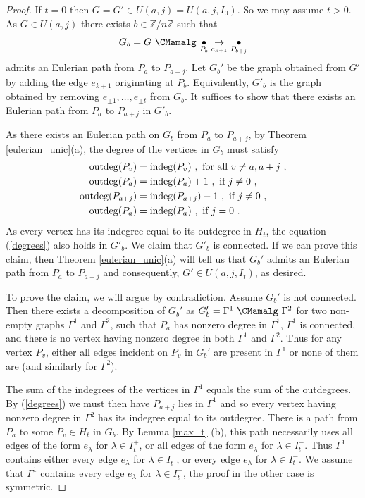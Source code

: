 \documentclass{amsproc}
\theoremstyle{definition}
\theoremstyle{remark}
\numberwithin{equation}{section}
\newcommand{\Z}{{\mathbb Z}}
\newcommand{\indeg}{{\rm indeg}}
\newcommand{\outdeg}{{\rm outdeg}}
\begin{document}
\begin{proof}
If $t=0$ then $G=G'\in U(a,j)=U(a,j,I_0)$. So we may assume $t>0$.
As $G\in U(a,j)$ there exists $b\in \Z/n\Z$ such that 
\[ G_b={G\ \CMamalg\ \underset{P_b}\bullet\underset{e_{k+1}}\rightarrow\underset {P_{b+j}}\bullet} \]
admits an Eulerian path from $P_a$ to $P_{a+j}$. Let $G_b'$ be the graph obtained from $G'$ by adding the edge $e_{k+1}$ originating at $P_b$.
Equivalently, $G'_b$ is the graph obtained by removing $e_{\pm 1}, \ldots, e_{\pm t}$ from $G_b$.
It suffices to show that there exists an Eulerian path from $P_a$ to $P_{a+j}$ in $G'_b$.

As there exists an Eulerian path on $G_b$ from $P_a$ to $P_{a+j}$, by Theorem \ref{eulerian_unic}(a), the degree of the vertices in $G_b$ must satisfy
\begin{equation}\label{degrees}
\begin{split}
\outdeg(P_v)&=\indeg(P_v)\ , \text{ for all $v\neq a,a+j$}\ ,\\
\outdeg(P_a)&=\indeg(P_a)+1\ , \text{ if $j\neq 0$}\ ,\\
\outdeg(P_{a+j})&=\indeg(P_{a+j})-1\ , \text{ if $j\neq 0$}\ ,\\
\outdeg(P_a)&=\indeg(P_a)\ , \text{ if $j=0$}\ .
\end{split}
\end{equation}
As every vertex has its indegree equal to its outdegree in $H_t$, the equation (\ref{degrees}) also holds in $G'_b$. We claim that $G'_b$ 
is connected. If we can prove this claim, then Theorem \ref{eulerian_unic}(a) will tell us that $G_b'$ admits an Eulerian path from $P_a$ 
to $P_{a+j}$ and consequently, $G'\in U(a,j,I_t)$, as desired.

To prove the claim, we will argue by contradiction. Assume $G_b'$ is not connected. Then there exists a decomposition of $G_b'$ as $G_b'=\Gamma^1\ \CMamalg\ \Gamma^2$ for two non-empty graphs $\Gamma^1$ and $\Gamma^2$, such that
$P_a$ has nonzero degree in $\Gamma^1$, $\Gamma^1$ is connected, and there is no vertex having nonzero degree in both $\Gamma^1$ and $\Gamma^2$. Thus for any vertex $P_v$, either all edges incident on $P_v$ in $G_b'$ are present in $\Gamma^1$ or none of them are (and similarly for $\Gamma^2$).

The sum of the indegrees of the vertices in $\Gamma^1$ equals the sum of the outdegrees. By (\ref{degrees}) we must then have $P_{a+j}$ lies in $\Gamma^1$ and so every vertex having nonzero degree in $\Gamma^2$ has its indegree equal to its outdegree. There is a path from $P_{a}$ to some $P_v\in H_t$ in $G_b$. By Lemma \ref{max_t} (b), this path necessarily uses all edges of the form $e_\lambda$ for $\lambda\in I_t^+$, or all edges of the form $e_\lambda$ for $\lambda\in I_t^-$. Thus $\Gamma^1$ contains either every edge $e_\lambda$ for $\lambda\in I_t^+$, or every edge $e_\lambda$ for $\lambda\in I_t^-$. We assume that $\Gamma^1$ contains every edge $e_\lambda$ for $\lambda\in I_t^+$, the proof in the other case is symmetric.


\end{proof}
\end{document}
